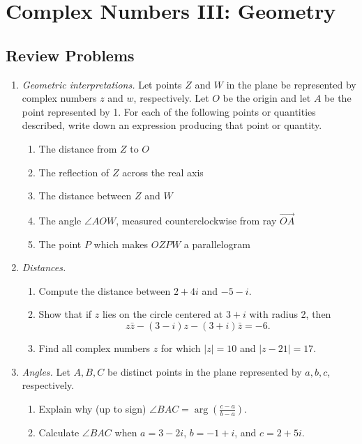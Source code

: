 \section{Complex Numbers III: Geometry}

\subsection{Review Problems}

\begin{enumerate}
\item \emph{Geometric interpretations.} Let points $Z$ and $W$ in the plane be represented by complex numbers $z$ and $w$, respectively. Let $O$ be the origin and let $A$ be the point represented by 1. For each of the following points or quantities described, write down an expression producing that point or quantity.
\begin{enumerate}
\item The distance from $Z$ to $O$
\item The reflection of $Z$ across the real axis
\item The distance between $Z$ and $W$
\item The angle $\angle AOW$, measured counterclockwise from ray $\overrightarrow{OA}$
\item The point $P$ which makes $OZPW$ a parallelogram
\end{enumerate}
\item \emph{Distances.}
\begin{enumerate}
\item Compute the distance between $2 + 4i$ and $-5 - i$.
\item Show that if $z$ lies on the circle centered at $3 + i$ with radius 2, then 
\begin{equation*}
z\bar{z} - (3 - i)z - (3 + i)\bar{z} = -6.
\end{equation*}
\item Find all complex numbers $z$ for which $\lvert z\rvert = 10$ and $\lvert z - 21\rvert = 17$.
\end{enumerate}
\item \emph{Angles.} Let $A,B,C$ be distinct points in the plane represented by $a,b,c$, respectively.
\begin{enumerate}
\item Explain why (up to sign) $\angle BAC = \arg(\frac{c - a}{b - a})$.
\item Calculate $\angle BAC$ when $a = 3 - 2i$, $b = -1 + i$, and $c = 2 + 5i$.
\end{enumerate}

\end{enumerate}
